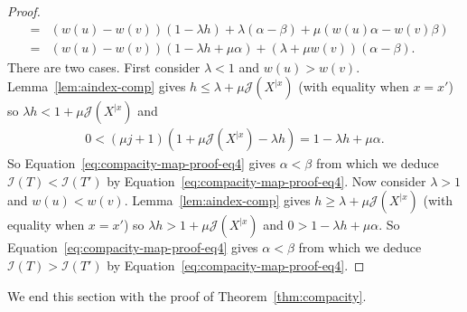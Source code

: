 \documentclass[11 pt]{modarticle}
\newcommand{\wmap}{w}
\newcommand{\rtree}[2]{{#1}^{\lvert #2}}
\newcommand{\indexsymbol}{\mathcal{I}}
\newcommand{\tindex}[1]{\indexsymbol(#1)}
\newcommand{\rindexsymbol}{\mathcal{J}}
\newcommand{\rindex}[2]{\rindexsymbol(\rtree{#2}{#1})}
\begin{document}
\begin{proof}
\begin{eqnarray}
	& = & (\wmap(u) - \wmap(v))(1 - \lambda h) + \lambda(\alpha - \beta) + \mu (\wmap(u)\alpha - \wmap(v) \beta) \nonumber \\
	& = & (\wmap(u) - \wmap(v))(1 - \lambda h + \mu \alpha)  + (\lambda + \mu \wmap(v))(\alpha - \beta). \label{eq:compacity-map-proof-eq4}
\end{eqnarray}
There are two cases. First consider $\lambda < 1$ and $\wmap(u) > \wmap(v)$. Lemma~\ref{lem:aindex-comp} gives $h \leq \lambda + \mu \rindex{x}{X}$ (with equality when $x = x'$) so $\lambda h < 1 + \mu \rindex{x}{X}$ and
\begin{eqnarray*}
	0 < (\mu j + 1)(1 + \mu \rindex{x}{X} - \lambda h) =  1 - \lambda h + \mu \alpha.
\end{eqnarray*}
So Equation~\eqref{eq:compacity-map-proof-eq4} gives $\alpha < \beta$ from which we deduce $\tindex{T} < \tindex{T'}$ by Equation~\eqref{eq:compacity-map-proof-eq4}. Now consider $\lambda > 1$ and $\wmap(u) < \wmap(v)$. Lemma~\ref{lem:aindex-comp} gives $h \geq \lambda + \mu \rindex{x}{X}$  (with equality when $x = x'$) so $\lambda h > 1 + \mu \rindex{x}{X}$ and $0 > 1 - \lambda h + \mu \alpha$. So Equation~\eqref{eq:compacity-map-proof-eq4} gives $\alpha < \beta$ from which we deduce $\tindex{T} > \tindex{T'}$ by Equation~\eqref{eq:compacity-map-proof-eq4}.
\end{proof}

We end this section with the proof of Theorem~\ref{thm:compacity}.
\end{document}
